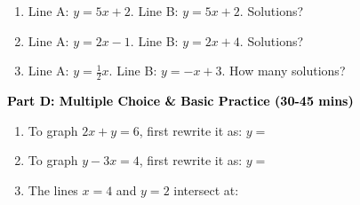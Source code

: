 \documentclass[12pt, letterpaper, fleqn]{article}
\newcommand{\blank}{\underline{\hspace{2.2cm}}}
\begin{document}
\vspace{3mm}

\begin{enumerate}[itemsep=2.5cm, leftmargin=0.6cm, resume]
\item Line A: $y = 5x + 2$. Line B: $y = 5x + 2$. Solutions? \blank
\item Line A: $y = 2x - 1$. Line B: $y = 2x + 4$. Solutions? \blank
\item Line A: $y = \frac{1}{2}x$. Line B: $y = -x + 3$. How many solutions? \blank
\end{enumerate}

\newpage

\begin{tcolorbox}[colback=customteal!20]
\large\textcolor{black}{\textbf{Part D: Multiple Choice \& Basic Practice (30-45 mins)}}
\end{tcolorbox}

\vspace{3mm}

\begin{enumerate}[itemsep=2.5cm, leftmargin=0.6cm, resume]
\item To graph $2x + y = 6$, first rewrite it as: $y = $ \blank
\item To graph $y - 3x = 4$, first rewrite it as: $y = $ \blank
\item The lines $x = 4$ and $y = 2$ intersect at: \blank
\end{enumerate}
\end{document}
